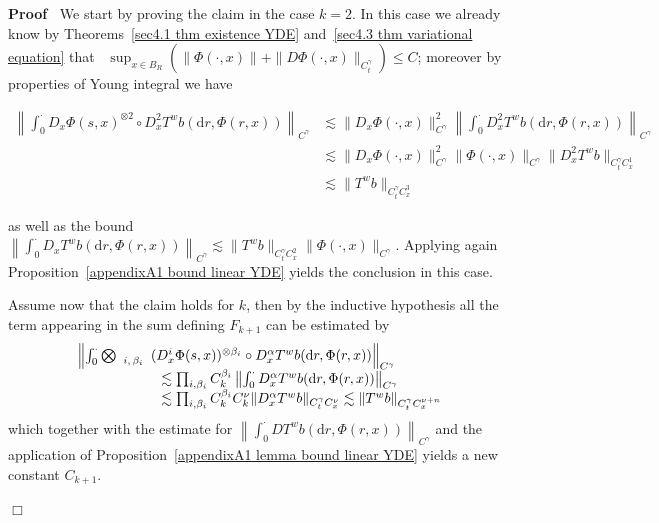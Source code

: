 \documentclass[10pt]{article}
\newcommand{\mathd}{\mathrm{d}}
\newcommand{\nobracket}{}
\newcommand{\tmscript}[1]{\text{\scriptsize{$#1$}}}
\newenvironment{proof}{\noindent\textbf{Proof\ }}{\hspace*{\fill}$\Box$\medskip}
\begin{document}
\begin{proof}
  We start by proving the claim in the case $k = 2$. In this case we already
  know by Theorems~\ref{sec4.1 thm existence YDE} and~\ref{sec4.3 thm
  variational equation} that \ $\sup_{x \in B_R}  (\| \Phi (\cdot, x) \| + \|
  D \Phi (\cdot, x) \|_{C^{\gamma}_t}) \leqslant C$; moreover by properties of
  Young integral we have
  
  \begin{align*}
    \left\| \int_0^{\cdot} D_x \Phi (s, x)^{\otimes 2} \circ \nobracket D_x^2
    T^w b (\mathd r, \Phi (r, x) \nobracket) \right\|_{C^{\gamma}} & \lesssim
    \| D_x \Phi (\cdot, x) \|_{C^{\gamma}}^2  \left\| \int_0^{\cdot} D_x^2 T^w
    b (\mathd r, \Phi (r, x)) \right\|_{C^{\gamma}}\\
    & \lesssim \| D_x \Phi (\cdot, x) \|_{C^{\gamma}}^2  \| \Phi (\cdot, x)
    \|_{C^{\gamma}}  \| D_x^2 T^w b \|_{C^{\gamma}_t C^1_x}\\
    & \lesssim \| T^w b \|_{C^{\gamma}_t C^3_x}
  \end{align*}
  
  as well as the bound $\left\| \int_0^{\cdot} D_x T^w b (\mathd r, \Phi (r,
  x)) \right\|_{C^{\gamma}} \lesssim \| T^w b \|_{C^{\gamma}_t C^2_x}  \| \Phi
  (\cdot, x) \|_{C^{\gamma}}$. Applying again Proposition~\ref{appendixA1
  bound linear YDE} yields the conclusion in this case.
  
  Assume now that the claim holds for $k$, then by the inductive hypothesis
  all the term appearing in the sum defining $F_{k + 1}$ can be estimated by
  \[ \begin{array}{l}
       \left\| \int_0^{\cdot} \bigotimes_{\tmscript{\begin{array}{c}
         i, \beta_i
       \end{array}}} (D_x^i \Phi (s, x))^{\otimes \beta_i} \circ \nobracket
       D_x^{\alpha} T^w b (\mathd r, \Phi (r, x) \nobracket)
       \right\|_{C^{\gamma}}\\
       \qquad \qquad \qquad \lesssim \prod_{i, \beta_i} C_k^{\beta_i}  \left\|
       \int_0^{\cdot} D_x^{\alpha} T^w b (\mathd r, \Phi (r, x))
       \right\|_{C^{\gamma}}\\
       \qquad \qquad \qquad \lesssim \prod_{i, \beta_i} C_k^{\beta_i}
       C_k^{\nu}  \| D_x^{\alpha} T^w b \|_{C^{\gamma}_t C^{\nu}_x} \lesssim
       \| T^w b \|_{C^{\gamma}_t C^{\nu + n}_x}
     \end{array} \]
  which together with the estimate for $\left\| \int_0^{\cdot} D T^w b (\mathd
  r, \Phi (r, x)) \right\|_{C^{\gamma}}$ and the application of
  Proposition~\ref{appendixA1 lemma bound linear YDE} yields a new constant
  $C_{k + 1}$.
  

\end{proof}
\end{document}
